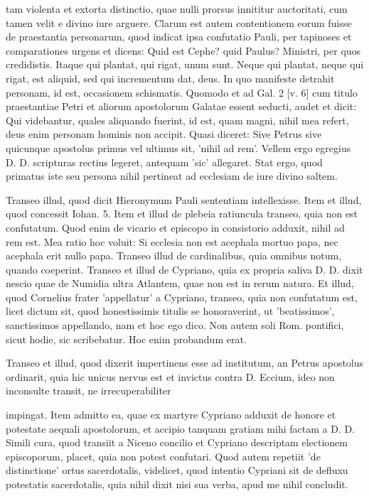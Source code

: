 tam violenta et extorta distinctio, quae nulli prorsus innititur auctoritati, cum tamen velit e divino iure arguere. Clarum est autem contentionem eorum fuisse de praestantia personarum, quod indicat ipsa confutatio Pauli, per tapinoses et comparationes urgens et dicens: Quid est Cephe? quid Paulus? Ministri, per quos credidistis. Itaque qui plantat, qui rigat, unum sunt. Neque qui plantat, neque qui rigat, est aliquid, sed qui incrementum dat, deus. In quo manifeste detrahit personam, id est, occasionem schismatis. Quomodo et ad Gal. 2 [v. 6] cum titulo praestantiae Petri et aliorum apostolorum Galatae essent seducti, audet et dicit: Qui videbantur, quales aliquando fuerint, id est, quam magni, nihil mea refert, deus enim personam hominis non accipit. Quasi diceret: Sive Petrus sive quicunque apostolus primus vel ultimus sit, 'nihil ad rem'. Vellem ergo egregius D. D. scripturas rectius legeret, antequam 'sic' allegaret. Stat ergo, quod primatus iste seu persona nihil pertineat ad ecclesiam de iure divino saltem.

Transeo illud, quod dicit Hieronymum Pauli sententiam intellexisse. Item et illud, quod concessit Iohan. 5. Item et illud de plebeia ratiuncula transeo, quia non est confutatum. Quod enim de vicario et episcopo in consistorio adduxit, nihil ad rem est. Mea ratio hoc voluit: Si ecclesia non est acephala mortuo papa, nec acephala erit nullo papa. Transeo illud de cardinalibus, quia omnibus notum, quando coeperint. Transeo et illud de Cypriano, quia ex propria saliva D. D. dixit nescio quae de Numidia ultra Atlantem, quae non est in rerum natura. Et illud, quod Cornelius frater 'appellatur' a Cypriano, transeo, quia non confutatum est, licet dictum sit, quod honestissimis titulis se honoraverint, ut 'beatissimos', sanctissimos appellando, nam et hoc ego dico. Non autem soli Rom. pontifici, sicut hodie, sic scribebatur. Hoc enim probandum erat.

Transeo et illud, quod dixerit impertinens esse ad institutum, an Petrus apostolus ordinarit, quia hic unicus nervus \marginpar{\small[272]} est et invictus contra D. Eccium, ideo non inconsulte transit, ne irrecuperabiliter

impingat. Item admitto ea, quae ex martyre Cypriano adduxit de honore et potestate aequali apostolorum, et accipio tanquam gratiam mihi factam a D. D. Simili cura, quod transiit a Niceno concilio et Cypriano descriptam electionem episcoporum, placet, quia non potest confutari. Quod autem repetiit 'de distinctione' ortus sacerdotalis, videlicet, quod intentio Cypriani sit de defluxu potestatis sacerdotalis, quia nihil dixit nisi sua verba, apud me nihil concludit.

